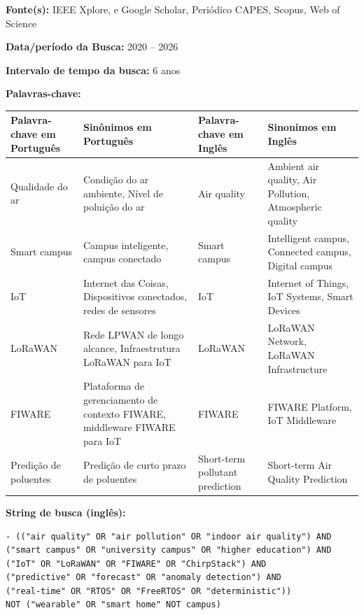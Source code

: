 \documentclass[12pt,a4paper]{article}
\begin{document}
\vspace{0.5cm}
\noindent \textbf{Fonte(s):} IEEE Xplore, e Google Scholar, Periódico CAPES, Scopus, Web of Science

\vspace{0.5cm}
\noindent \textbf{Data/período da Busca:} 2020 -- 2026

\vspace{0.5cm}
\noindent \textbf{Intervalo de tempo da busca:} 6 anos

\newpage
\vspace{0.5cm}
\noindent \textbf{Palavras-chave:}
\vspace{0.3cm}

\begin{table}[H]
\centering
\begin{tabular}{|p{4 cm}|p{4 cm}|p{4 cm}|p{4 cm}|}
\hline
\textbf{Palavra-chave em Português}
& \textbf{Sinônimos em Português}
& \textbf{Palavra-chave em Inglês}
& \textbf{Sinonimos em Inglês}\\
\hline
Qualidade do ar
& Condição do ar ambiente, Nível de poluição do ar
& Air quality
& Ambient air quality, Air Pollution, Atmospheric quality\\
\hline
Smart campus
& Campus inteligente, campus conectado
& Smart campus
& Intelligent campus, Connected campus, Digital campus\\
\hline
IoT
& Internet das Coisas, Dispositivos conectados, redes de sensores
& IoT
& Internet of Things, IoT Systems, Smart Devices\\
\hline
LoRaWAN
& Rede LPWAN de longo alcance, Infraestrutura LoRaWAN para IoT
& LoRaWAN
& LoRaWAN Network, LoRaWAN Infrastructure\\
\hline
FIWARE
& Plataforma de gerenciamento de contexto FIWARE, middleware FIWARE para IoT
& FIWARE
& FIWARE Platform, IoT Middleware\\
\hline
Predição de poluentes
& Predição de curto prazo de poluentes
& Short-term pollutant prediction
& Short-term Air Quality Prediction\\
\hline
\end{tabular}
\end{table}

\vspace{0.5cm}
\noindent \textbf{String de busca (inglês):}
\begin{verbatim}
- (("air quality" OR "air pollution" OR "indoor air quality") AND
("smart campus" OR "university campus" OR "higher education") AND
("IoT" OR "LoRaWAN" OR "FIWARE" OR "ChirpStack") AND
("predictive" OR "forecast" OR "anomaly detection") AND
("real-time" OR "RTOS" OR "FreeRTOS" OR "deterministic"))
NOT ("wearable" OR "smart home" NOT campus)
\end{verbatim}
\end{document}
